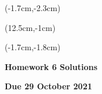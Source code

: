 \documentclass[12pt, oneside]{article}
\begin{document}
\begin{textblock*}{4cm}(-1.7cm,-2.3cm)
\end{textblock*}

\begin{textblock*}{8cm}(12.5cm,-1cm)
\end{textblock*}
\begin{textblock*}{13.5cm}(-1.7cm,-1.8cm)
\end{textblock*}

\vspace{1cm}

\begin{center}
\textbf{\Large Homework 6 Solutions}

\textbf{Due 29 October 2021}
\end{center}
\end{document}
